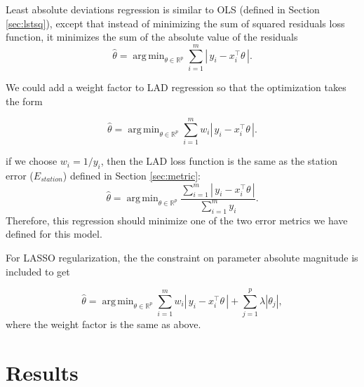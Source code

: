 \documentclass[11pt]{article}
\DeclareMathOperator*{\argmin}{arg\,min}
\begin{document}
Least absolute deviations regression is similar to OLS (defined in Section \ref{sec:lstsq}), except that instead of minimizing the sum of squared residuals loss function, it minimizes the sum of the absolute value of the residuals
\[\hat{\theta} = \argmin_{\theta\in\mathbb{R}^p}\sum_{i=1}^m \left|\,y_i - x_i^{\top} \theta \,\right|.\]

We could add a weight factor to LAD regression so that the optimization takes the form

\[\hat{\theta} = \argmin_{\theta\in\mathbb{R}^p}\sum_{i=1}^m w_i \left|\,y_i - x_i^{\top} \theta \,\right|.\]

if we choose $w_i = 1 / y_i$, then the LAD loss function is the same as the station error ($E_{station}$) defined in Section \ref{sec:metric}:
\[\hat{\theta} = \argmin_{\theta\in\mathbb{R}^p}\displaystyle\frac{\sum\limits_{i=1}^m \left|\,y_i - x_i^{\top} \theta \,\right|}{\sum\limits_{i=1}^{m}y_i}.\] Therefore, this regression should minimize one of the two error metrics we have defined for this model. 

For LASSO regularization, the the constraint on parameter absolute magnitude is included to get

\[\hat{\theta} = \argmin_{\theta\in\mathbb{R}^p}\sum_{i=1}^m w_i \left|\,y_i - x_i^{\top} \theta \,\right| + \sum_{j=1}^p\lambda\left|\theta_j\right|,\] where the weight factor is the same as above.






\section{Results}
\end{document}
